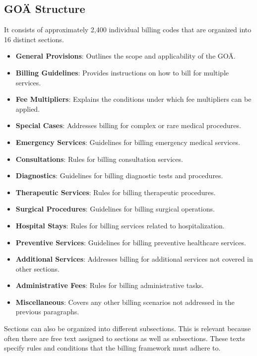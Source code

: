 \subsection{GOÄ Structure}
It consists of approximately 2,400 individual billing codes that are organized into 16 distinct sections\cite[]{hermanns2011gebuhrenordnung}.

\begin{itemize}
    \item \textbf{General Provisions}: Outlines the scope and applicability of the GOÄ.
    \item \textbf{Billing Guidelines}: Provides instructions on how to bill for multiple services.
    \item \textbf{Fee Multipliers}: Explains the conditions under which fee multipliers can be applied.
    \item \textbf{Special Cases}: Addresses billing for complex or rare medical procedures.
    \item \textbf{Emergency Services}: Guidelines for billing emergency medical services.
    \item \textbf{Consultations}: Rules for billing consultation services.
    \item \textbf{Diagnostics}: Guidelines for billing diagnostic tests and procedures.
    \item \textbf{Therapeutic Services}: Rules for billing therapeutic procedures.
    \item \textbf{Surgical Procedures}: Guidelines for billing surgical operations.
    \item \textbf{Hospital Stays}: Rules for billing services related to hospitalization.
    \item \textbf{Preventive Services}: Guidelines for billing preventive healthcare services.
    \item \textbf{Additional Services}: Addresses billing for additional services not covered in other sections.
    \item \textbf{Administrative Fees}: Rules for billing administrative tasks.
    \item \textbf{Miscellaneous}: Covers any other billing scenarios not addressed in the previous paragraphs.
\end{itemize}
Sections can also be organized into different subsections.
This is relevant because often there are free text assigned to sections as well as subsections.
These texts specify rules and conditions that the billing framework must adhere to.

